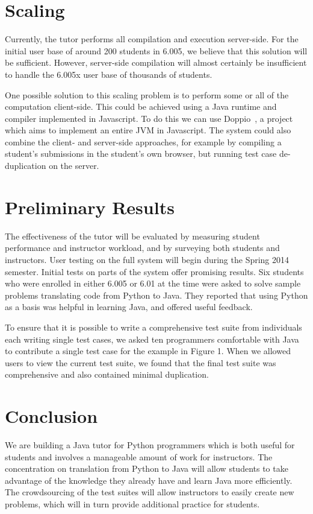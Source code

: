 \documentclass{sigchi}
\begin{document}
\section{Scaling}

Currently, the tutor performs all compilation and execution server-side. For the initial user base of around 200 students in 6.005, we believe that this solution will be sufficient. However, server-side compilation will almost certainly be insufficient to handle the 6.005x user base of thousands of students.

One possible solution to this scaling problem is to perform some or all of the computation client-side. This could be achieved using a Java runtime and compiler implemented in Javascript. To do this we can use Doppio~\cite{doppio}, a project which aims to implement an entire JVM in Javascript. The system could also combine the client- and server-side approaches, for example by compiling a student's submissions in the student's own browser, but running test case de-duplication on the server.

\section{Preliminary Results}

The effectiveness of the tutor will be evaluated by measuring student performance and instructor workload, and by surveying both students and instructors. User testing on the full system will begin during the Spring 2014 semester. Initial tests on parts of the system offer promising results. Six students who were enrolled in either 6.005 or 6.01 at the time were asked to solve sample problems translating code from Python to Java. They reported that using Python as a basis was helpful in learning Java, and offered useful feedback.

To ensure that it is possible to write a comprehensive test suite from individuals each writing single test cases, we asked ten programmers comfortable with Java to contribute a single test case for the example in Figure 1. When we allowed users to view the current test suite, we found that the final test suite was comprehensive and also contained minimal duplication.

\section{Conclusion}

We are building a Java tutor for Python programmers which is both useful for students and involves a manageable amount of work for instructors. The concentration on translation from Python to Java will allow students to take advantage of the knowledge they already have and learn Java more efficiently. The crowdsourcing of the test suites will allow instructors to easily create new problems, which will in turn provide additional practice for students.



\end{document}
